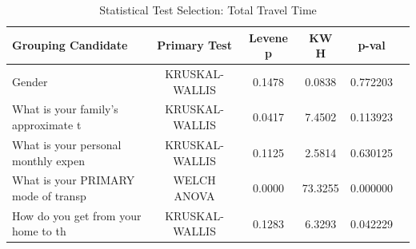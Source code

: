 \begin{table}[htbp]
\centering
\caption{Statistical Test Selection: Total Travel Time}
\label{tab:analysis_04_total_travel_time}
\begin{tabular}{lccccc}
\hline
\textbf{Grouping Candidate} & \textbf{Primary Test} & \textbf{Levene p} & \textbf{KW H} & \textbf{p-val} \\
\hline
Gender & KRUSKAL-WALLIS & 0.1478 & 0.0838 & 0.772203 \\
What is your family's approximate t & KRUSKAL-WALLIS & 0.0417 & 7.4502 & 0.113923 \\
What is your personal monthly expen & KRUSKAL-WALLIS & 0.1125 & 2.5814 & 0.630125 \\
What is your PRIMARY mode of transp & WELCH ANOVA & 0.0000 & 73.3255 & 0.000000 \\
How do you get from your home to th & KRUSKAL-WALLIS & 0.1283 & 6.3293 & 0.042229 \\
\hline
\end{tabular}
\end{table}
